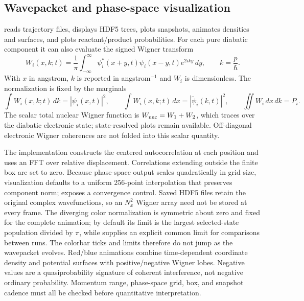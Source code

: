 \documentclass[11pt]{article}
\newcommand{\code}[1]{\texttt{\detokenize{#1}}}
\begin{document}
\subsection{Wavepacket and phase-space visualization}

\code{ShowDyn.py} reads trajectory files, displays HDF5 trees, plots snapshots,
animates densities and surfaces, and plots reactant/product probabilities. For each
pure diabatic component it can also evaluate the signed Wigner transform
\begin{equation}
 W_i(x,k;t)=\frac{1}{\pi}\int_{-\infty}^{\infty}
 \psi_i^*(x+y,t)\psi_i(x-y,t)e^{2iky}\,dy,
 \qquad k=\frac{p}{\hbar}.
\end{equation}
With $x$ in angstrom, $k$ is reported in angstrom$^{-1}$ and $W_i$ is
dimensionless. The normalization is fixed by the marginals
\begin{equation}
 \int W_i(x,k;t)\,dk=|\psi_i(x,t)|^2,\qquad
 \int W_i(x,k;t)\,dx=|\tilde\psi_i(k,t)|^2,\qquad
 \iint W_i\,dx\,dk=P_i.
\end{equation}
The scalar total nuclear Wigner function is
$W_{\rm nuc}=W_1+W_2$, which traces over the diabatic electronic state;
state-resolved plots remain available. Off-diagonal electronic Wigner coherences
are not folded into this scalar quantity.

The implementation constructs the centered autocorrelation at each position and
uses an FFT over relative displacement. Correlations extending outside the finite
box are set to zero. Because phase-space output scales quadratically in grid size,
visualization defaults to a uniform 256-point interpolation that preserves component
norm; \code{--wigner-points} exposes a convergence control. Saved HDF5 files retain
the original complex wavefunctions, so an $N_x^2$ Wigner array need not be stored at
every frame. The diverging color normalization is symmetric about zero and fixed for
the complete animation; by default its limit is the largest selected-state population
divided by $\pi$, while \code{--wigner-limit} supplies an explicit common limit for
comparisons between runs. The colorbar ticks and limits therefore do not jump as the
wavepacket evolves. Red/blue animations combine time-dependent coordinate density and
potential surfaces with positive/negative Wigner lobes. Negative values are a
quasiprobability signature of coherent interference, not negative ordinary
probability. Momentum range, phase-space grid, box, and snapshot cadence must all be
checked before quantitative interpretation.
\end{document}
